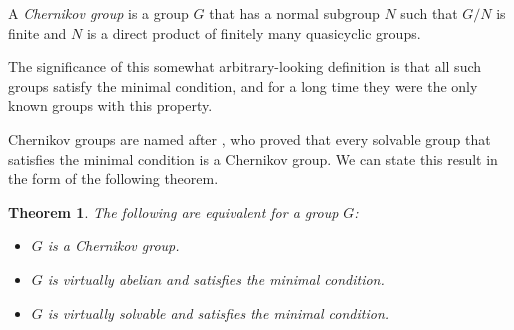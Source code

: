 \documentclass[12pt]{article}
\newtheorem*{thm*}{Theorem}
\begin{document}

A \emph{Chernikov group} is a group $G$ that has a normal subgroup $N$ 
such that $G/N$ is finite 
and $N$ is a direct product of finitely many quasicyclic groups.

The significance of this somewhat arbitrary-looking definition is that all such groups satisfy the minimal condition, and for a long time they were the only known groups with this property.

Chernikov groups are named after ,
who proved that every solvable group that satisfies the minimal condition
is a Chernikov group.
We can state this result in the form of the following theorem.

\begin{thm*}
The following are equivalent for a group $G$:
\begin{itemize}
\item $G$ is a Chernikov group.
\item $G$ is virtually abelian and satisfies the minimal condition.
\item $G$ is virtually solvable and satisfies the minimal condition.
\end{itemize}
\end{thm*}
\end{document}
